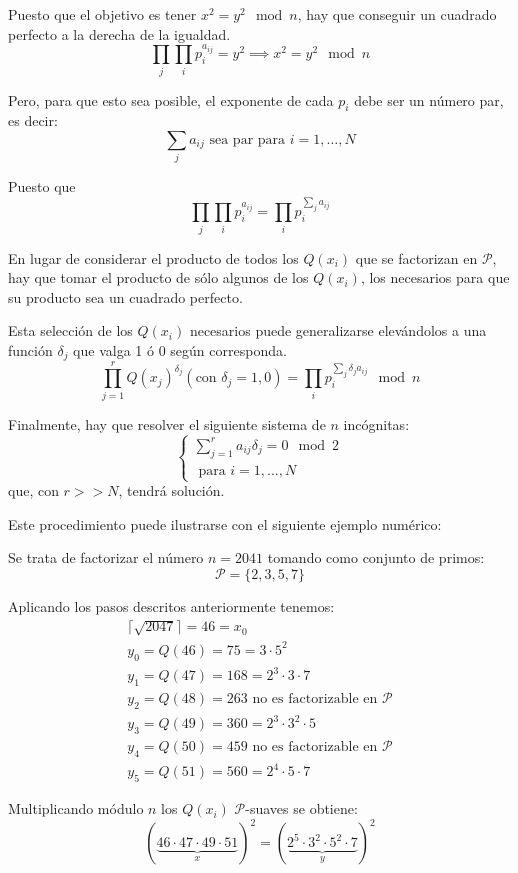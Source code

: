 \documentclass[nochap]{apuntesURJC}
\begin{document}
Puesto que el objetivo es tener $x^2=y^2 \mod n$, hay que conseguir un cuadrado perfecto a la derecha de la igualdad.
\[\prod_j\prod_ip_i^{a_{ij}} = y^2 \implies x^2 = y^2 \mod n\]

Pero, para que esto sea posible, el exponente de cada $p_i$ debe ser un número par, es decir:
\[\sum_ja_{ij} \text{ sea par para } i={1,…,N}\]

Puesto que
\[\prod_j\prod_ip_i^{a_{ij}} = \prod_i p_i^{\sum_ja_{ij}}\]

En lugar de considerar el producto de todos los $Q(x_i)$ que se factorizan en $\mathcal{P}$, hay que tomar el producto de sólo algunos de los $Q(x_i)$, los necesarios para que su producto sea un cuadrado perfecto.

Esta selección de los $Q(x_i)$ necesarios puede generalizarse elevándolos a una función $\delta_j$ que valga 1 ó 0 según corresponda.
\[\prod_{j=1}^r Q(x_j)^{δ_j} (\text{con } δ_j = 1,0)  = \prod_ip_i^{\sum_jδ_ja_{ij}} \mod n\]

Finalmente, hay que resolver el siguiente sistema de $n$ incógnitas:
\[\left\{ \begin{array}{l}
\sum\limits_{j=1}^{r}a_{ij}δ_j = 0 \mod 2 \\
\text{ para } i=1,...,N
\end{array}\right.\]
que, con $r >> N$, tendrá solución.

Este procedimiento puede ilustrarse con el siguiente ejemplo numérico:

Se trata de factorizar el número $n=2041$ tomando como conjunto de primos:
\[\mathcal{P} = \{ 2,3,5,7\}\]

Aplicando los pasos descritos anteriormente tenemos:
\[\begin{array}{l}
\lceil\sqrt{2047}\rceil = 46 = x_0 \\
y_0 = Q(46) = 75 = 3 \cdot 5^2\\
y_1 = Q(47) = 168 = 2^3 \cdot 3 \cdot 7\\
y_2 = Q(48) = 263 \text{ no es factorizable en }\mathcal{P} \\
y_3 = Q(49) = 360 = 2^3 \cdot 3^2 \cdot 5\\
y_4 = Q(50) = 459 \text{ no es factorizable en }\mathcal{P} \\
y_5 = Q(51) = 560 = 2^4 \cdot 5 \cdot 7
\end{array}\]

Multiplicando módulo $n$ los $Q(x_i)$ $\mathcal{P}$-suaves se obtiene:
\[(\underbrace{46\cdot 47 \cdot 49 \cdot 51}_{x})^2 = (\underbrace{2^5\cdot 3^2 \cdot 5^2 \cdot 7}_y)^2\]
\end{document}
